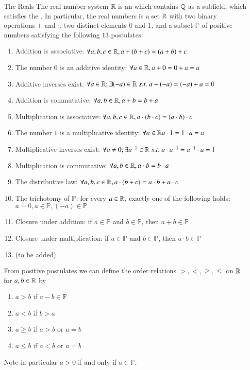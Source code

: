 \documentclass[12pt]{report}
\begin{document}
\begin{defn}{The Reals}{}
    The real number system $\mathbb R$ is an  which contains $\mathbb Q$ as a subfield, which satisfies the . In particular, the real numbers is a set $\mathbb R$ with two binary operations $+$ and $\cdot$, two distinct elements $0$ and $1$, and a subset $\mathbb{P}$ of positive numbers satisfying the following $13$ postulates:
    \begin{enumerate}
        \item Addition is associative: $\forall a,b,c \in \mathbb R, a+(b+c) = (a+b)+c$
        \item The number $0$ is an additive identity: $\forall a \in \mathbb R, a+0 = 0+a = a$
        \item Additive inverses exist: $\forall a \in \mathbb R;\exists (-a) \in \mathbb R\;s.t.\;a+(-a) = (-a)+a=0$
        \item Addition is commutative: $\forall a,b \in \mathbb R, a+b = b+a$
        \item Multiplication is associative: $\forall a,b,c \in \mathbb R, a\cdot (b\cdot c) = (a \cdot b) \cdot c$
        \item The number $1$ is a multiplicative identity: $\forall a\in \mathbb R a\cdot 1 = 1\cdot a = a$
        \item Multiplicative inverses exist: $\forall a \neq 0;\exists a^{-1} \in \mathbb R\;s.t.\;a\cdot a^{-1} = a^{-1} \cdot a = 1$
        \item Multiplication is commutative: $\forall a,b \in \mathbb R, a\cdot b = b \cdot a$
        \item The distributive law: $\forall a,b,c \in \mathbb R, a\cdot (b+c) = a\cdot b + a \cdot c$
        \item The trichotomy of $\mathbb{P}$: for every $a \in \mathbb R$, exactly one of the following holds: $a = 0, a \in \mathbb{P}, (-a) \in \mathbb{P}$
        \item Closure under addition: if $a \in \mathbb{P}$ and $b \in \mathbb{P}$, then $a+b \in \mathbb{P}$
        \item Closure under multiplication: if $a \in \mathbb{P}$ and $b \in \mathbb{P}$, then $a\cdot b \in \mathbb{P}$
        \item (to be added)
    \end{enumerate}
    From positive postulates we can define the order relations $>, <, \geq, \leq$ on $\mathbb R$ for $a,b \in \mathbb R$ by \begin{enumerate}
        \item $a > b$ if $a-b \in \mathbb{P}$
        \item $a < b$ if $b > a$ 
        \item $a \geq b$ if $a > b$ or $a = b$
        \item $a \leq b$ if $a < b$ or $a = b$
    \end{enumerate}
    Note in particular $a > 0$ if and only if $a \in \mathbb{P}$.
\end{defn}
\end{document}

